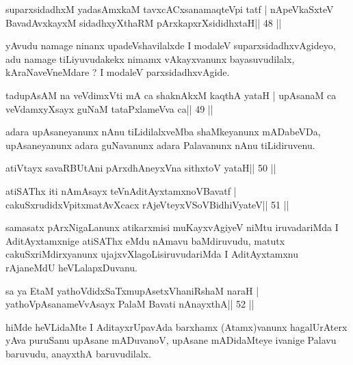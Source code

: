 \begin{shl}
suparxsidadhxM yadasAmxkaM tavxcACxsanamaqteV\s pi tatf |
nApeVkaSxteV BavadAvxkayxM sidadhxyXthaRM pArxkapxrXsididhxtaH\hfill || 48 ||
\end{shl}

\begin{artha}
yAvudu namage ninanx upadeVshavilalxde I modaleV suparxsidadhxvAgideyo,  adu namage tiLiyuvudakekx nimamx vAkayxvanunx bayasuvudilalx, kAraNaveVneMdare ? I modaleV parxsidadhxvAgide.
\end{artha}


\begin{shl}
tadupAsAM na veVdimxVti mA ca shaknAkxM kaqthA yataH |
upAsanaM ca veVdamxyXsayx guNaM tataPxlameVva ca\hfill || 49 ||
\end{shl}

\begin{artha}
adara upAsaneyanunx nAnu tiLidilalxveMba shaMkeyanunx mADabeVDa, upAsaneyanunx adara guNavanunx adara Palavanunx nAnu tiLidiruvenu.
\end{artha}



\begin{shl}
atiVtayx savaRBUtAni pArxdhAneyxVna sithxtoV yataH\hfill || 50 ||
\end{shl}

\begin{shl}
atiSAThx iti nAmAsayx teVnAditAyxtamxnoV\s Bavatf |
cakuSxrudidxVpitxmatAvXcacx rAjeVteyxVSoV\s BidhiVyateV\hfill || 51 ||
\end{shl}

\begin{artha}
samasatx pArxNigaLanunx atikarxmisi muKayxvAgiyeV niMtu iruvadariMda I  AditAyxtamxnige atiSAThx eMdu nAmavu baMdiruvudu, matutx  cakuSxriMdirxyanunx ujajxvXlagoLisiruvudariMda I AditAyxtamxnu rAjaneMdU heVLalapxDuvanu.
\end{artha}

\begin{shl}
sa ya EtaM yathoVdidxSaTxmupAsetxV\s haniRshaM naraH |
yathoVpAsanameVvAsayx PalaM Bavati nAnayxthA\hfill || 52 ||
\end{shl}

\begin{artha}
hiMde heVLidaMte I AditayxrUpavAda barxhamx (Atamx)vanunx hagalUrAterx yAva puruSanu upAsane mADuvanoV, upAsane mADidaMteye ivanige Palavu baruvudu, anayxthA baruvudilalx.
\end{artha}

